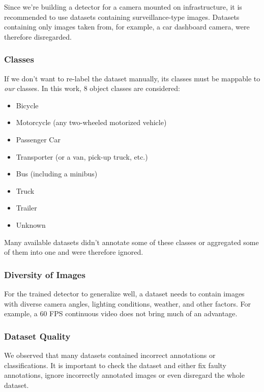 Since we're building a detector for a camera mounted on infrastructure, it is
recommended to use datasets containing surveillance-type images. Datasets
containing only images taken from, for example, a car dashboard camera, were
therefore disregarded.

\subsubsection*{Classes}
\label{Classes}

If we don't want to re-label the dataset manually, its classes must be mappable
to \textit{our} classes. In this work, 8 object classes are considered:
\begin{itemize}
    \item Bicycle
    \item Motorcycle (any two-wheeled motorized vehicle)
    \item Passenger Car
    \item Transporter (or a van, pick-up truck, etc.)
    \item Bus (including a minibus)
    \item Truck
    \item Trailer
    \item Unknown
\end{itemize}

Many available datasets didn't annotate some of these classes or aggregated some of them into one
and were therefore ignored.

\subsubsection*{Diversity of Images}

For the trained detector to generalize well, a dataset needs to
contain images with diverse camera angles, lighting conditions, weather, and
other factors. For example, a 60 FPS continuous video does not bring much of an
advantage.

\subsubsection*{Dataset Quality}

We observed that many datasets contained incorrect annotations or
classifications. It is important to check the dataset and either fix faulty
annotations, ignore incorrectly annotated images or even disregard the whole
dataset.



